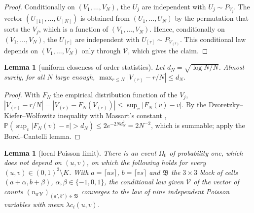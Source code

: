 \documentclass[11pt,a4paper]{article}
\newtheorem{lemma}[theorem]{Lemma}
\theoremstyle{definition}
\theoremstyle{remark}
\newcommand{\Prob}{\mathbb{P}}
\newcommand{\cV}{\mathcal{V}}
\begin{document}
\begin{proof}
Conditionally on $(V_1,\dots,V_N)$, the $U_j$ are independent with $U_j\sim P_{V_j}$. The vector $(U_{[1]},\dots,U_{[N]})$ is obtained from $(U_1,\dots,U_N)$ by the permutation that sorts the $V_j$, which is a function of $(V_1,\dots,V_N)$. Hence, conditionally on $(V_1,\dots,V_N)$, the $U_{[r]}$ are independent with $U_{[r]}\sim P_{V_{(r)}}$. This conditional law depends on $(V_1,\dots,V_N)$ only through $\cV$, which gives the claim.
\end{proof}

\begin{lemma}[uniform closeness of order statistics]\label{lem:dkw}
Let $d_N=\sqrt{\log N/N}$. Almost surely, for all $N$ large enough, $\max_{r\le N}|V_{(r)}-r/N|\le d_N$.
\end{lemma}

\begin{proof}
With $F_N$ the empirical distribution function of the $V_j$, $|V_{(r)}-r/N|=|V_{(r)}-F_N(V_{(r)})|\le\sup_v|F_N(v)-v|$. By the Dvoretzky--Kiefer--Wolfowitz inequality with Massart's constant \citep{massart1990}, $\Prob(\sup_v|F_N(v)-v|>d_N)\le2e^{-2Nd_N^2}=2N^{-2}$, which is summable; apply the Borel--Cantelli lemma.
\end{proof}

\begin{lemma}[local Poisson limit]\label{lem:poisson}
There is an event $\Omega_0$ of probability one, which does not depend on $(u,v)$, on which the following holds for every $(u,v)\in(0,1)^2\setminus K$. With $a=\lceil us\rceil$, $b=\lceil vs\rceil$ and $\mathfrak B$ the $3\times3$ block of cells $(a+\alpha,b+\beta)$, $\alpha,\beta\in\{-1,0,1\}$, the conditional law given $\cV$ of the vector of counts $(n_{a'b'})_{(a',b')\in\mathfrak B}$ converges to the law of nine independent Poisson variables with mean $\lambda c_i(u,v)$.
\end{lemma}
\end{document}
